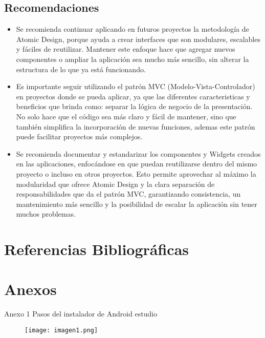 \documentclass[12pt,letterpaper]{article}
\begin{document}
\subsection{Recomendaciones}

\begin{itemize}
    \item Se recomienda continuar aplicando en futuros proyectos la metodología de Atomic Design, porque ayuda a crear interfaces que son modulares, escalables y fáciles de reutilizar. Mantener este enfoque hace que agregar nuevos componentes o ampliar la aplicación sea mucho más sencillo, sin alterar la estructura de lo que ya está funcionando.
    
    \item Es importante seguir utilizando el patrón MVC (Modelo-Vista-Controlador) en proyectos donde se pueda aplicar, ya que las diferentes caracteristicas y beneficios que brinda como: separar la lógica de negocio de la presentación. No solo hace que el código sea más claro y fácil de mantener, sino que también simplifica la incorporación de nuevas funciones, ademas este patrón puede facilitar proyectos más complejos.
    
    \item Se recomienda documentar y estandarizar los componentes y Widgets creados en las aplicaciones, enfocándose en que puedan reutilizarse dentro del mismo proyecto o incluso en otros proyectos. Esto permite aprovechar al máximo la modularidad que ofrece Atomic Design y la clara separación de responsabilidades que da el patrón MVC, garantizando consistencia, un mantenimiento más sencillo y la posibilidad de escalar la aplicación sin tener muchos problemas.
\end{itemize}



\section{Referencias Bibliográficas}
\printbibliography[heading=none]


\section{Anexos}
Anexo 1 Pasos del instalador de Android estudio
\begin{figure}[h!]
    \centering
    \texttt{[image: imagen1.png]}
\end{figure}
\end{document}
